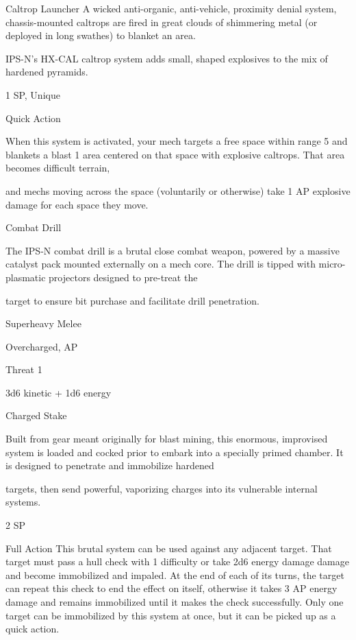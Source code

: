 Caltrop Launcher  
A wicked anti-organic, anti-vehicle, proximity denial system, chassis-mounted caltrops are fired in great  
clouds of shimmering metal (or deployed in long swathes) to blanket an area.   

IPS-N’s HX-CAL caltrop system adds small, shaped explosives to the mix of hardened pyramids.  

1 SP, Unique
 
Quick Action
 
When this system is activated, your mech targets a free space within range 5 and blankets a  
blast 1 area centered on that space with explosive caltrops. That area becomes difficult terrain,  

                                                                                                                     


and mechs moving across the space (voluntarily or otherwise) take 1 AP explosive damage for  
each space they move.
 

Combat Drill  

The IPS-N combat drill is a brutal close combat weapon, powered by a massive catalyst pack mounted  
externally on a mech core. The drill is tipped with micro-plasmatic projectors designed to pre-treat the  

target to ensure bit purchase and facilitate drill penetration.   

Superheavy Melee
 
Overcharged, AP
 
Threat 1
 
3d6 kinetic + 1d6 energy
 

Charged Stake
 

Built from gear meant originally for blast mining, this enormous, improvised system is loaded and cocked  
prior to embark into a specially primed chamber. It is designed to penetrate and immobilize hardened  

targets, then send powerful, vaporizing charges into its vulnerable internal systems.  

2 SP
 

Full Action  
This brutal system can be used against any adjacent target. That target must pass a hull check  
with 1 difficulty or take 2d6 energy damage damage and become immobilized and impaled. At  
the end of each of its turns, the target can repeat this check to end the effect on itself, otherwise  
it takes 3 AP energy damage and remains immobilized until it makes the check successfully. Only  
one target can be immobilized by this system at once, but it can be picked up as a quick action.
 

                                                                                                                    

